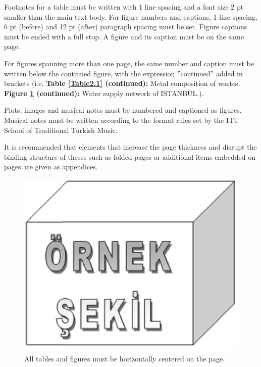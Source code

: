 Footnotes for a table must be written with 1 line spacing and a font size 2 pt smaller than the main text body. 
For figure numbers and captions, 1 line spacing, 6 pt (before) and 12 pt (after) paragraph spacing must be set. Figure captions must be ended with a full stop. A figure and its caption must be on the same page. 

For figures spanning more than one page, the same number and caption must be written below the continued figure, with the expression ”continued” added in brackets (i.e. \textbf{Table \ref{Table2.1} (continued):} Metal composition of wastes. \textbf{Figure \ref{Figure2.1} (continued):} Water supply network of ISTANBUL.).

Plots, images and musical notes must be numbered and captioned as figures. Musical notes must be written according to the format rules set by the ITU School of Traditional Turkish Music. 

It is recommended that elements that increase the page thickness and disrupt the binding structure of theses such as  folded pages or additional items embedded on pages are given as appendices.

\vspace{6pt}
\begin{figure}[h]
	\centering
	\includegraphics[scale=.3]{./fig/sekil1}
	\vspace{6pt}
	\caption{All tables and figures must be horizontally centered on the page.}
	\label{Figure2.1}
\end{figure}

